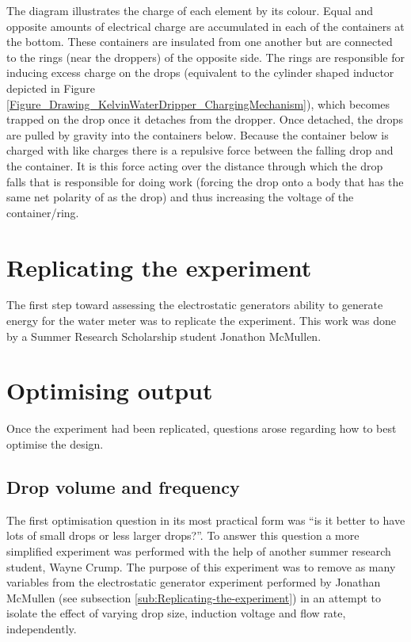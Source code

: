 The diagram illustrates the charge of each element by its colour.
Equal and opposite amounts of electrical charge are accumulated in
each of the containers at the bottom. These containers are insulated
from one another but are connected to the rings (near the droppers)
of the opposite side. The rings are responsible for inducing excess
charge on the drops (equivalent to the cylinder shaped inductor depicted
in Figure \ref{Figure_Drawing_KelvinWaterDripper_ChargingMechanism}),
which becomes trapped on the drop once it detaches from the dropper.
Once detached, the drops are pulled by gravity into the containers
below. Because the container below is charged with like charges there
is a repulsive force between the falling drop and the container. It
is this force acting over the distance through which the drop falls
that is responsible for doing work (forcing the drop onto a body that
has the same net polarity of as the drop) and thus increasing the
voltage of the container/ring.


\section{Replicating the experiment\label{sub:Replicating-the-experiment}}

The first step toward assessing the electrostatic generators ability
to generate energy for the water meter was to replicate the experiment.
This work was done by a Summer Research Scholarship student Jonathon
McMullen.


\section{Optimising output}

Once the experiment had been replicated, questions arose regarding
how to best optimise the design.


\subsection{Drop volume and frequency}

The first optimisation question in its most practical form was ``is
it better to have lots of small drops or less larger drops?''. To
answer this question a more simplified experiment was performed with
the help of another summer research student, Wayne Crump. The purpose
of this experiment was to remove as many variables from the electrostatic
generator experiment performed by Jonathan McMullen (see subsection
\ref{sub:Replicating-the-experiment}) in an attempt to isolate the
effect of varying drop size, induction voltage and flow rate, independently.


